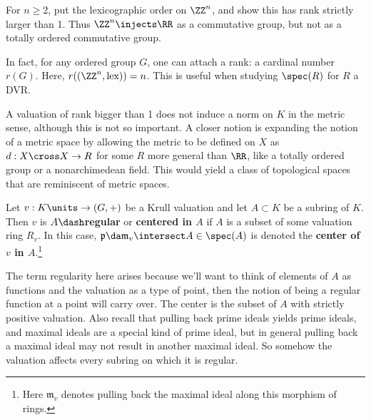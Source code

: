 \begin{exercise}[?]

For \(n\geq 2\), put the lexicographic order on \(\ZZ^n\), and show this
has rank strictly larger than 1. Thus \(\ZZ^n\injects \RR\) as a
commutative group, but not as a totally ordered commutative group.

\end{exercise}

\begin{remark}

In fact, for any ordered group \(G\), one can attach a rank: a cardinal
number \(r(G)\). Here, \(r((\ZZ^n, \text{lex})) = n\). This is useful
when studying \(\spec(R)\) for \(R\) a DVR.

\end{remark}

A valuation of rank bigger than 1 does not induce a norm on \(K\) in the
metric sense, although this is not so important. A closer notion is
expanding the notion of a metric space by allowing the metric to be
defined on \(X\) as \(d: X\cross X \to R\) for some \(R\) more general
than \(\RR\), like a totally ordered group or a nonarchimedean field.
This would yield a class of topological spaces that are reminiscent of
metric spaces.

\begin{definition}

Let \(v:K\units \to (G, +)\) be a Krull valuation and let
\(A \subset K\) be a subring of \(K\). Then \(v\) is
\textbf{\(A\dash\)regular} or \textbf{centered in \(A\)} if \(A\) is a
subset of some valuation ring \(R_v\). In this case,
\(\mathfrak{p} \da \mathfrak{m}_v \intersect A \in \spec(A)\) is denoted
the \textbf{center of \(v\) in \(A\)}.\footnote{Here \(\mathfrak{m}_v\)
  denotes pulling back the maximal ideal along this morphism of rings.}

\end{definition}

\begin{remark}

The term regularity here arises because we'll want to think of elements
of \(A\) as functions and the valuation as a type of point, then the
notion of being a regular function at a point will carry over. The
center is the subset of \(A\) with strictly positive valuation. Also
recall that pulling back prime ideals yields prime ideals, and maximal
ideals are a special kind of prime ideal, but in general pulling back a
maximal ideal may not result in another maximal ideal. So somehow the
valuation affects every subring on which it is regular.

\end{remark}


